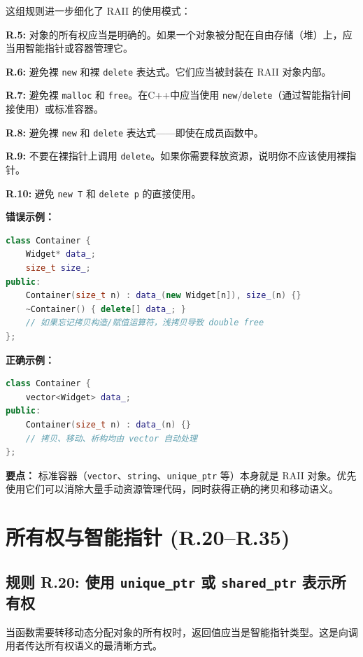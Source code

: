 这组规则进一步细化了 RAII 的使用模式：

\textbf{R.5:} 对象的所有权应当是明确的。如果一个对象被分配在自由存储（堆）上，应当用智能指针或容器管理它。

\textbf{R.6:} 避免裸 \texttt{new} 和裸 \texttt{delete} 表达式。它们应当被封装在 RAII 对象内部。

\textbf{R.7:} 避免裸 \texttt{malloc} 和 \texttt{free}。在C++中应当使用 \texttt{new}/\allowbreak{}\texttt{delete}（通过智能指针间接使用）或标准容器。

\textbf{R.8:} 避免裸 \texttt{new} 和 \texttt{delete} 表达式——即使在成员函数中。

\textbf{R.9:} 不要在裸指针上调用 \texttt{delete}。如果你需要释放资源，说明你不应该使用裸指针。

\textbf{R.10:} 避免 \texttt{new T{}} 和 \texttt{delete p} 的直接使用。

\textbf{错误示例：}

\begin{lstlisting}[language=C++]
class Container {
    Widget* data_;
    size_t size_;
public:
    Container(size_t n) : data_(new Widget[n]), size_(n) {}
    ~Container() { delete[] data_; }
    // 如果忘记拷贝构造/赋值运算符，浅拷贝导致 double free
};
\end{lstlisting}

\textbf{正确示例：}

\begin{lstlisting}[language=C++]
class Container {
    vector<Widget> data_;
public:
    Container(size_t n) : data_(n) {}
    // 拷贝、移动、析构均由 vector 自动处理
};
\end{lstlisting}

\textbf{要点：} 标准容器（\texttt{vector}、\texttt{string}、\texttt{unique\_ptr} 等）本身就是 RAII 对象。优先使用它们可以消除大量手动资源管理代码，同时获得正确的拷贝和移动语义。

\section{所有权与智能指针 (R.20--R.35)}

\subsection*{\textbf{规则 R.20:} 使用 \texttt{unique\_ptr} 或 \texttt{shared\_ptr} 表示所有权}

当函数需要转移动态分配对象的所有权时，返回值应当是智能指针类型。这是向调用者传达所有权语义的最清晰方式。

